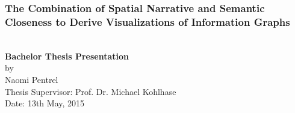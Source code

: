 \begin{frame}
  \frametitle{The Combination of Spatial Narrative and Semantic Closeness to Derive Visualizations of Information Graphs}
  \begin{module}[id=titlePage]
  \centering \\
  \textbf{Bachelor Thesis Presentation}\\
  \vspace{3mm}
  by\\
  Naomi Pentrel\\
 \vspace{5mm}
  Thesis Supervisor: Prof. Dr. Michael Kohlhase\\
  \vspace{5mm}
  Date: 13th May, 2015\\
  \end{module}
\end{frame}

